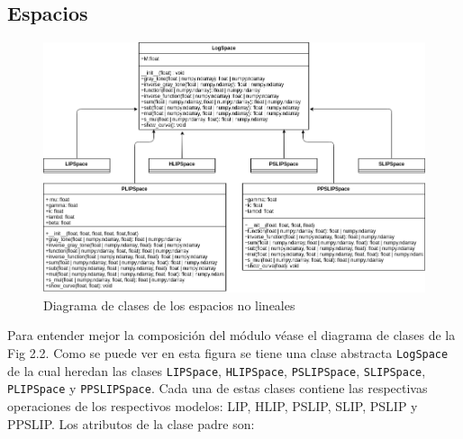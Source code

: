 \subsection{Espacios}

\begin{figure}
	\begin{center}
		\includegraphics[width=16.0 cm]{images/spaces_class_diagram.png}
		\caption{Diagrama de clases de los espacios no lineales}
	\end{center}
\end{figure}

Para entender mejor la composici\'on del m\'odulo v\'ease el diagrama de clases de la Fig 2.2. Como se puede ver en esta figura se tiene una clase abstracta \verb|LogSpace| de la cual heredan las clases \verb|LIPSpace|, \verb|HLIPSpace|, \verb|PSLIPSpace|, \verb|SLIPSpace|, \verb|PLIPSpace| y \verb|PPSLIPSpace|. Cada una de estas clases contiene las respectivas operaciones de los respectivos modelos: LIP, HLIP, PSLIP, SLIP, PSLIP y PPSLIP. Los atributos de la clase padre son:

